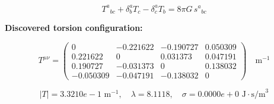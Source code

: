 
\begin{equation}
  T^a{}_{bc} + \delta^a_b T_c - \delta^a_c T_b = 8\pi G \, s^a{}_{bc}
\end{equation}

\textbf{Discovered torsion configuration:}

\begin{equation}
  T^{\mu\nu} = \begin{pmatrix}
    0 & -0.221622 & -0.190727 & 0.050309 \\
    0.221622 & 0 & 0.031373 & 0.047191 \\
    0.190727 & -0.031373 & 0 & 0.138032 \\
    -0.050309 & -0.047191 & -0.138032 & 0
  \end{pmatrix} \quad \text{m}^{-1}
\end{equation}

\begin{equation}
  |T| = 3.3210e-1 \text{ m}^{-1}, \quad
  \lambda = 8.1118, \quad
  \sigma = 0.0000e+0 \text{ J}\cdot\text{s/m}^3
\end{equation}